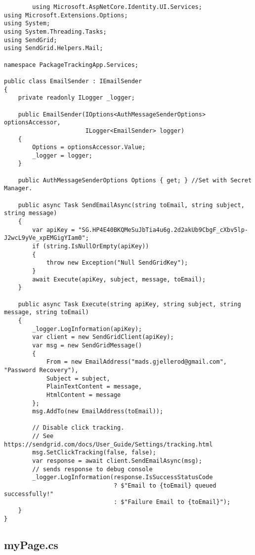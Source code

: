 \begin{verbatim}
        using Microsoft.AspNetCore.Identity.UI.Services;
using Microsoft.Extensions.Options;
using System;
using System.Threading.Tasks;
using SendGrid;
using SendGrid.Helpers.Mail;

namespace PackageTrackingApp.Services;

public class EmailSender : IEmailSender
{
    private readonly ILogger _logger;

    public EmailSender(IOptions<AuthMessageSenderOptions> optionsAccessor,
                       ILogger<EmailSender> logger)
    {
        Options = optionsAccessor.Value;
        _logger = logger;
    }

    public AuthMessageSenderOptions Options { get; } //Set with Secret Manager.
    
    public async Task SendEmailAsync(string toEmail, string subject, string message)
    {
        var apiKey = "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";
        if (string.IsNullOrEmpty(apiKey))
        {
            throw new Exception("Null SendGridKey");
        }
        await Execute(apiKey, subject, message, toEmail);
    }

    public async Task Execute(string apiKey, string subject, string message, string toEmail)
    {
        _logger.LogInformation(apiKey);
        var client = new SendGridClient(apiKey);
        var msg = new SendGridMessage()
        {
            From = new EmailAddress("mads.gjellerod@gmail.com", "Password Recovery"),
            Subject = subject,
            PlainTextContent = message,
            HtmlContent = message
        };
        msg.AddTo(new EmailAddress(toEmail));

        // Disable click tracking.
        // See https://sendgrid.com/docs/User_Guide/Settings/tracking.html
        msg.SetClickTracking(false, false);
        var response = await client.SendEmailAsync(msg);
        // sends response to debug console
        _logger.LogInformation(response.IsSuccessStatusCode
                               ? $"Email to {toEmail} queued successfully!"
                               : $"Failure Email to {toEmail}");
    }
}
\end{verbatim}


\subsection{myPage.cs}

